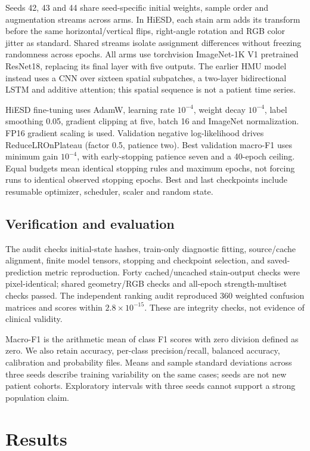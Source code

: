 \documentclass[conference]{IEEEtran}
\begin{document}
Seeds 42, 43 and 44 share seed-specific initial weights, sample order and augmentation streams across arms. In HiESD, each stain arm adds its transform before the same horizontal/vertical flips, right-angle rotation and RGB color jitter as standard. Shared streams isolate assignment differences without freezing randomness across epochs. All arms use torchvision ImageNet-1K V1 pretrained ResNet18, replacing its final layer with five outputs. The earlier HMU model instead uses a CNN over sixteen spatial subpatches, a two-layer bidirectional LSTM and additive attention; this spatial sequence is not a patient time series.

HiESD fine-tuning uses AdamW, learning rate $10^{-4}$, weight decay $10^{-4}$, label smoothing 0.05, gradient clipping at five, batch 16 and ImageNet normalization. FP16 gradient scaling is used. Validation negative log-likelihood drives ReduceLROnPlateau (factor 0.5, patience two). Best validation macro-F1 uses minimum gain $10^{-4}$, with early-stopping patience seven and a 40-epoch ceiling. Equal budgets mean identical stopping rules and maximum epochs, not forcing runs to identical observed stopping epochs. Best and last checkpoints include resumable optimizer, scheduler, scaler and random state.

\subsection{Verification and evaluation}
The audit checks initial-state hashes, train-only diagnostic fitting, source/cache alignment, finite model tensors, stopping and checkpoint selection, and saved-prediction metric reproduction. Forty cached/uncached stain-output checks were pixel-identical; shared geometry/RGB checks and all-epoch strength-multiset checks passed. The independent ranking audit reproduced 360 weighted confusion matrices and scores within $2.8\times10^{-15}$. These are integrity checks, not evidence of clinical validity.

Macro-F1 is the arithmetic mean of class F1 scores with zero division defined as zero. We also retain accuracy, per-class precision/recall, balanced accuracy, calibration and probability files. Means and sample standard deviations across three seeds describe training variability on the same cases; seeds are not new patient cohorts. Exploratory intervals with three seeds cannot support a strong population claim.

\section{Results}
\end{document}

